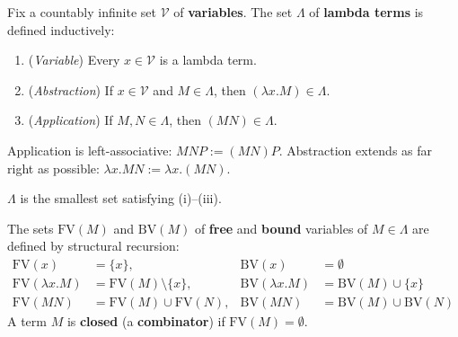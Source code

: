 \begin{tcolorbox}[colback=propbox, colframe=propborder, arc=2pt,
  left=6pt, right=6pt, top=4pt, bottom=4pt,
  title={\small\textbf{Definition (Lambda Terms)}},
  fonttitle=\small\bfseries]
\label{def:lambda-terms}
Fix a countably infinite set $\mathcal{V}$ of \textbf{variables}.
The set $\Lambda$ of \textbf{lambda terms} is defined inductively:
\begin{enumerate}
  \item[(i)] (\textit{Variable}) Every $x \in \mathcal{V}$ is a
             lambda term.
  \item[(ii)] (\textit{Abstraction}) If $x \in \mathcal{V}$ and
              $M \in \Lambda$, then $(\lambda x.M) \in \Lambda$.
  \item[(iii)] (\textit{Application}) If $M, N \in \Lambda$,
               then $(MN) \in \Lambda$.
\end{enumerate}
Application is left-associative: $MNP := (MN)P$.
Abstraction extends as far right as possible:
$\lambda x.MN := \lambda x.(MN)$.
\end{tcolorbox}

\begin{remark*}
$\Lambda$ is the smallest set satisfying (i)--(iii).
\end{remark*}

\begin{remark*}[Flash]
\end{remark*}

\begin{tcolorbox}[colback=propbox, colframe=propborder, arc=2pt,
  left=6pt, right=6pt, top=4pt, bottom=4pt,
  title={\small\textbf{Definition (Free and Bound Variables)}},
  fonttitle=\small\bfseries]
\label{def:free-bound-variables}
The sets $\mathrm{FV}(M)$ and $\mathrm{BV}(M)$ of
\textbf{free} and \textbf{bound} variables of $M \in \Lambda$
are defined by structural recursion:
\begin{align*}
\mathrm{FV}(x)        &= \{x\},
  & \mathrm{BV}(x)        &= \emptyset \\
\mathrm{FV}(\lambda x.M) &= \mathrm{FV}(M) \setminus \{x\},
  & \mathrm{BV}(\lambda x.M) &= \mathrm{BV}(M) \cup \{x\} \\
\mathrm{FV}(MN)       &= \mathrm{FV}(M) \cup \mathrm{FV}(N),
  & \mathrm{BV}(MN)       &= \mathrm{BV}(M) \cup \mathrm{BV}(N)
\end{align*}
A term $M$ is \textbf{closed} (a \textbf{combinator}) if
$\mathrm{FV}(M) = \emptyset$.
\end{tcolorbox}

